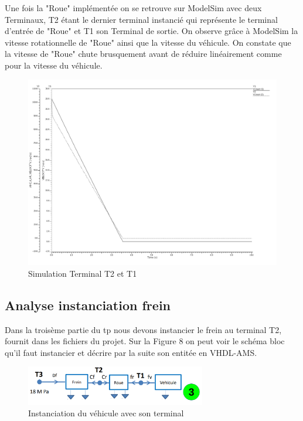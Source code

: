 \newpage

Une fois la "Roue" implémentée on se retrouve sur ModelSim avec deux Terminaux, T2 étant le dernier terminal instancié qui représente le terminal d'entrée de "Roue" et T1 son Terminal de sortie. On observe grâce à ModelSim la vitesse rotationnelle de "Roue" ainsi que la vitesse du véhicule. On constate que la vitesse de "Roue" chute brusquement avant de réduire linéairement comme pour la vitesse du véhicule.

\begin{figure}[h]
    \centering
    \includegraphics[width=\textwidth]{images/Frein.png}
    \caption{Simulation Terminal T2 et T1}
\end{figure}

\subsection{Analyse instanciation frein}

Dans la troisème partie du tp nous devons instancier le frein au terminal T2, fournit dans les fichiers du projet. Sur la Figure 8 on peut voir le schéma bloc qu'il faut instancier et décrire par la suite son entitée en VHDL-AMS.

\begin{figure}[h]
    \centering
    \includegraphics[width=0.7\textwidth]{images/trois.png}
    \caption{Instanciation du véhicule avec son terminal}
\end{figure}


